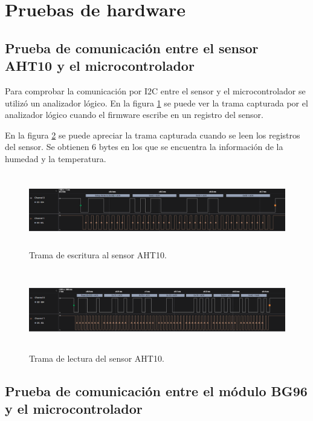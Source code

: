 \section{Pruebas de hardware}
\subsection{Prueba de comunicación entre el sensor AHT10 y el microcontrolador}
Para comprobar la comunicación por I2C entre el sensor y el microcontrolador se utilizó un analizador lógico.
En la figura \ref{fig:write aht10} se puede ver la trama capturada por el analizador lógico cuando el firmware escribe en un registro del sensor. 

En la figura \ref{fig:read aht10} se puede apreciar la trama capturada cuando se leen los registros del sensor. Se obtienen 6 bytes en los que se encuentra la información de la humedad y la temperatura.

\begin{figure}[h!]
  \centering
    \includegraphics[width=\linewidth, height=3.2cm]{./Figures/write_i2c.png}
  \caption{Trama de escritura al sensor AHT10.}
    \label{fig:write aht10}
\end{figure}

\begin{figure}[h!]
  \centering
    \includegraphics[width=\linewidth, height=3.5cm]{./Figures/read_i2c..png}
  \caption{Trama de lectura del sensor AHT10.}
    \label{fig:read aht10}
\end{figure}

\subsection{Prueba de comunicación entre el módulo BG96 y el microcontrolador}

